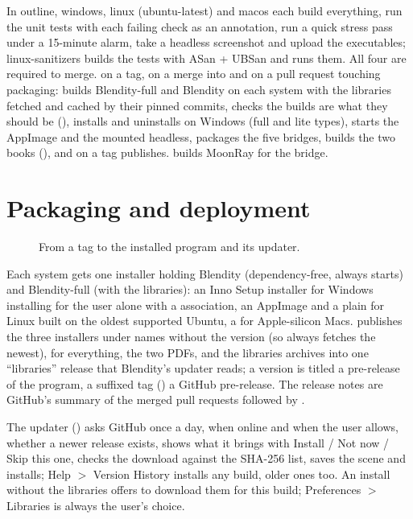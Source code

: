 In outline, windows, linux (ubuntu-latest) and macos each build everything, run the
unit tests with each failing check as an annotation, run a quick stress pass under a 15-minute alarm, take a headless
screenshot and upload the executables; linux-sanitizers builds the tests with ASan + UBSan and runs them. All four are
required to merge.  on a  tag, on a merge into  and on a pull request touching
packaging: builds Blendity-full and Blendity on each system with the libraries fetched and cached by their pinned
commits, checks the builds are what they should be (), installs and uninstalls on Windows (full and lite
types), starts the AppImage and the mounted  headless, packages the five bridges, builds the two books
(), and on a tag publishes.  builds MoonRay for the bridge.

\section{Packaging and deployment}
\begin{figure}[H]
  \centering
  \resizebox{\textwidth}{!}{}
  \caption{From a tag to the installed program and its updater.}
  \label{fig:deploy}
\end{figure}

Each system gets one installer holding Blendity (dependency-free, always starts) and Blendity-full (with the
libraries): an Inno Setup installer for Windows \cite{InnoSetup2026} installing for the user alone with a 
association, an AppImage \cite{AppImage2026} and a plain  for Linux built on the oldest supported Ubuntu,
a  for Apple-silicon Macs.  publishes the three installers under names without the
version (so  always fetches the newest),  for everything, the
two PDFs, and the libraries archives into one ``libraries'' release that Blendity's updater reads; a  version
is titled a pre-release of the program, a suffixed tag () a GitHub pre-release. The release notes are
GitHub's summary of the merged pull requests followed by .

The updater () asks GitHub once a day, when online and when the user allows, whether a newer release exists,
shows what it brings with Install / Not now / Skip this one, checks the download against the SHA-256 list, saves the
scene and installs; Help $>$ Version History installs any build, older ones too. An install without the libraries
offers to download them for this build; Preferences $>$ Libraries is always the user's choice.

